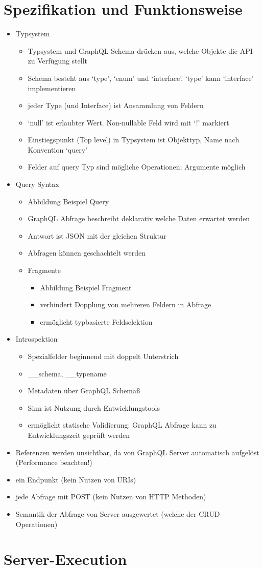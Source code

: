 \section{Spezifikation und Funktionsweise}
\begin{itemize}
  \item Typsystem
  \begin{itemize}
    \item Typsystem und GraphQL Schema drücken aus, welche Objekte die API zu Verfügung stellt
    \item Schema besteht aus `type', `enum' und `interface'. `type' kann `interface' implementieren
    \item jeder Type (und Interface) ist Ansammlung von Feldern
    \item `null' ist erlaubter Wert. Non-nullable Feld wird mit `!' markiert
    \item Einstiegspunkt (Top level) in Typsystem ist Objekttyp, Name nach Konvention `query'
    \item Felder auf query Typ sind mögliche Operationen; Argumente möglich
  \end{itemize}
  \item Query Syntax
  \begin{itemize}
    \item Abbildung Beispiel Query
    \item GraphQL Abfrage beschreibt deklarativ welche Daten erwartet werden
    \item Antwort ist JSON mit der gleichen Struktur
    \item Abfragen können geschachtelt werden
    \item Fragmente
    \begin{itemize}
      \item Abbildung Beispiel Fragment
      \item verhindert Dopplung von mehreren Feldern in Abfrage
      \item ermöglicht typbasierte Feldselektion
    \end{itemize}
  \end{itemize}
  \item Introspektion
  \begin{itemize}
    \item Spezialfelder beginnend mit doppelt Unterstrich
    \item \_\_schema, \_\_typename
    \item Metadaten über GraphQL Schemaß
    \item Sinn ist Nutzung durch Entwicklungstools
    \item ermöglicht statische Validierung: GraphQL Abfrage kann zu Entwicklungszeit geprüft werden
  \end{itemize}
  \item Referenzen werden unsichtbar, da von GraphQL Server automatisch aufgelöst (Performance beachten!)
  \item ein Endpunkt (kein Nutzen von URIs)
  \item jede Abfrage mit POST (kein Nutzen von HTTP Methoden)
  \item Semantik der Abfrage von Server ausgewertet (welche der CRUD Operationen)
\end{itemize}

\section{Server-Execution}
